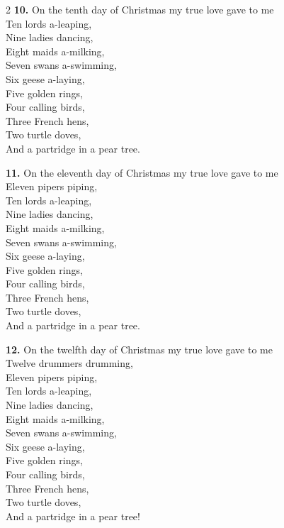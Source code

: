 \documentclass[a5paper,12pt]{article}
\begin{document}
\begin{multicols}{2}
\textbf{10.} On the tenth day of Christmas my true love gave to me\\
Ten lords a-leaping,\\
Nine ladies dancing,\\
Eight maids a-milking,\\
Seven swans a-swimming,\\
Six geese a-laying,\\
Five golden rings,\\
Four calling birds,\\
Three French hens,\\
Two turtle doves,\\
And a partridge in a pear tree.

\textbf{11.} On the eleventh day of Christmas my true love gave to me\\
Eleven pipers piping,\\
Ten lords a-leaping,\\
Nine ladies dancing,\\
Eight maids a-milking,\\
Seven swans a-swimming,\\
Six geese a-laying,\\
Five golden rings,\\
Four calling birds,\\
Three French hens,\\
Two turtle doves,\\
And a partridge in a pear tree.

\textbf{12.} On the twelfth day of Christmas my true love gave to me\\
Twelve drummers drumming,\\
Eleven pipers piping,\\
Ten lords a-leaping,\\
Nine ladies dancing,\\
Eight maids a-milking,\\
Seven swans a-swimming,\\
Six geese a-laying,\\
Five golden rings,\\
Four calling birds,\\
Three French hens,\\
Two turtle doves,\\
And a partridge in a pear tree!

\end{multicols}
\end{document}
